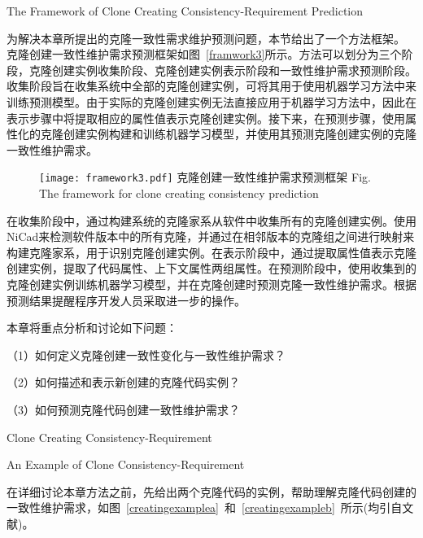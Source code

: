 {The Framework of Clone Creating Consistency-Requirement Prediction }

为解决本章所提出的克隆一致性需求维护预测问题，本节给出了一个方法框架。
克隆创建一致性维护需求预测框架如图~\ref{framwork3}所示。方法可以划分为三个阶段，克隆创建实例收集阶段、克隆创建实例表示阶段和一致性维护需求预测阶段。收集阶段旨在收集系统中全部的克隆创建实例，可将其用于使用机器学习方法中来训练预测模型。由于实际的克隆创建实例无法直接应用于机器学习方法中，因此在表示步骤中将提取相应的属性值表示克隆创建实例。接下来，在预测步骤，使用属性化的克隆创建实例构建和训练机器学习模型，并使用其预测克隆创建实例的克隆一致性维护需求。

\begin{figure}[htbp]
\centering
\texttt{[image: framework3.pdf]}
\bicaption[framwork3]{}
{克隆创建一致性维护需求预测框架}
{Fig.$\!$}{The framework for clone creating consistency prediction}
\vspace{-1em}
\end{figure}

在收集阶段中，通过构建系统的克隆家系从软件中收集所有的克隆创建实例。使用NiCad来检测软件版本中的所有克隆，并通过在相邻版本的克隆组之间进行映射来构建克隆家系，用于识别克隆创建实例。在表示阶段中，通过提取属性值表示克隆创建实例，提取了代码属性、上下文属性两组属性。在预测阶段中，使用收集到的克隆创建实例训练机器学习模型，并在克隆创建时预测克隆一致性维护需求。根据预测结果提醒程序开发人员采取进一步的操作。


本章将重点分析和讨论如下问题：

（1）如何定义克隆创建一致性变化与一致性维护需求？

（2）如何描述和表示新创建的克隆代码实例？

（3）如何预测克隆代码创建一致性维护需求？

{Clone Creating Consistency-Requirement}

{An Example of Clone Consistency-Requirement}

在详细讨论本章方法之前，先给出两个克隆代码的实例，帮助理解克隆代码创建的一致性维护需求，如图~\ref{creatingexamplea}~和~\ref{creatingexampleb}~所示(均引自文献\cite{wang2014predicting})。

